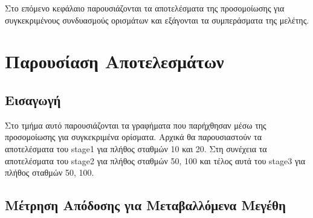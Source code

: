 \documentclass[12pt]{report}
\begin{document}
Στο επόμενο κεφάλαιο παρουσιάζονται τα αποτελέσματα της προσομοίωσης για συγκεκριμένους συνδυασμούς ορισμάτων και εξάγονται τα συμπεράσματα της μελέτης.

\chapter{Παρουσίαση Αποτελεσμάτων}\label{ch4}

\section{Εισαγωγή}
Στο τμήμα αυτό παρουσιάζονται τα γραφήματα που παρήχθησαν μέσω της προσομοίωσης για συγκεκριμένα ορίσματα. Αρχικά θα παρουσιαστούν τα αποτελέσματα του \textlatin{stage1} για πλήθος σταθμών 10 και 20. Στη συνέχεια τα αποτελέσματα του \textlatin{stage2} για πλήθος σταθμών 50, 100 και τέλος αυτά του \textlatin{stage3} για πλήθος σταθμών 50, 100.

\section{Μέτρηση Απόδοσης για Μεταβαλλόμενα Μεγέθη}
\end{document}
